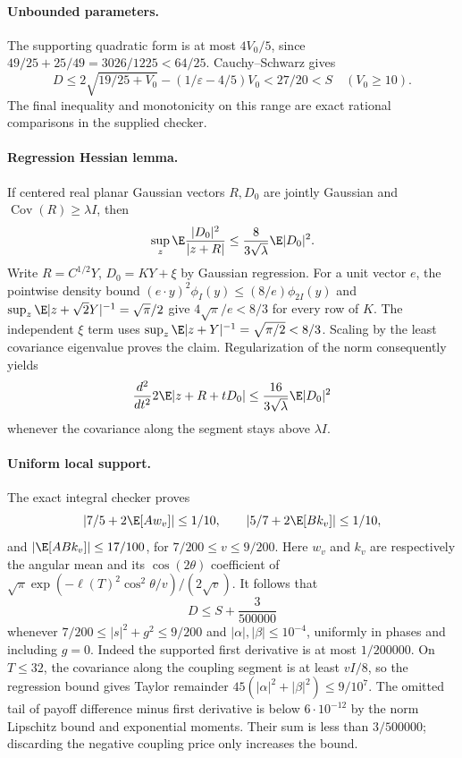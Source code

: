 \paragraph{Unbounded parameters.}
The supporting quadratic form is at most $4V_0/5$, since
$49/25+25/49=3026/1225<64/25$. Cauchy--Schwarz gives
\[
 D\le2\sqrt{19/25+V_0}-(1/\varepsilon-4/5)V_0<27/20<S
 \quad(V_0\ge10).
\]
The final inequality and monotonicity on this range are exact rational
comparisons in the supplied checker.

\paragraph{Regression Hessian lemma.}
If centered real planar Gaussian vectors $R,D_0$ are jointly Gaussian
and $\operatorname{Cov}(R)\ge\lambda I$, then
\[
 \sup_z\E\frac{|D_0|^2}{|z+R|}
 \le\frac8{3\sqrt\lambda}\E|D_0|^2.
\]
Write $R=C^{1/2}Y$, $D_0=KY+\xi$ by Gaussian regression.
For a unit vector $e$, the pointwise density bound
$(e\cdot y)^2\phi_I(y)\le(8/e)\phi_{2I}(y)$ and
$\sup_z\E|z+\sqrt2Y|^{-1}=\sqrt\pi/2$ give
$4\sqrt\pi/e<8/3$ for every row of $K$.
The independent $\xi$ term uses
$\sup_z\E|z+Y|^{-1}=\sqrt{\pi/2}<8/3$.
Scaling by the least covariance eigenvalue proves the claim.
Regularization of the norm consequently yields
\[
 \frac{d^2}{dt^2}2\E|z+R+tD_0|
 \le\frac{16}{3\sqrt\lambda}\E|D_0|^2
\]
whenever the covariance along the segment stays above $\lambda I$.

\paragraph{Uniform local support.}
The exact integral checker proves
\[
 |7/5+2\E[A w_v]|\le1/10,\qquad
 |5/7+2\E[B k_v]|\le1/10,
\]
and $|\E[ABk_v]|\le17/100$, for $7/200\le v\le9/200$.
Here $w_v$ and $k_v$ are respectively the angular mean and its
$\cos(2\theta)$ coefficient of
$\sqrt\pi\exp(-\ell(T)^2\cos^2\theta/v)/(2\sqrt v)$.
It follows that
\[
 \boxed{D\le S+\frac3{500000}}
\]
whenever $7/200\le|s|^2+g^2\le9/200$ and
$|\alpha|,|\beta|\le10^{-4}$, uniformly in phases and including $g=0$.
Indeed the supported first derivative is at most $1/200000$.
On $T\le32$, the covariance along the coupling segment is at least
$vI/8$, so the regression bound gives Taylor remainder
$45(|\alpha|^2+|\beta|^2)\le9/10^7$.
The omitted tail of payoff difference minus first derivative is below
$6\cdot10^{-12}$ by the norm Lipschitz bound and exponential moments.
Their sum is less than $3/500000$; discarding the negative coupling
price only increases the bound.

